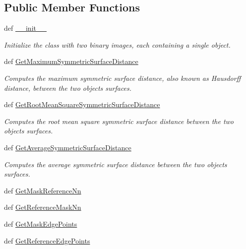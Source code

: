 \subsection*{Public Member Functions}
\begin{DoxyCompactItemize}
\item 
def \hyperlink{classmedpy_1_1metric_1_1Surface_1_1Surface_ab5851eb70bda096a86fb6716060167b7}{\_\-\_\-init\_\-\_\-}
\begin{DoxyCompactList}\small\item\em Initialize the class with two binary images, each containing a single object. \end{DoxyCompactList}\item 
def \hyperlink{classmedpy_1_1metric_1_1Surface_1_1Surface_a9cdf888536ae9f7ed0576fac57ac77c2}{GetMaximumSymmetricSurfaceDistance}
\begin{DoxyCompactList}\small\item\em Computes the maximum symmetric surface distance, also known as Hausdorff distance, between the two objects surfaces. \end{DoxyCompactList}\item 
def \hyperlink{classmedpy_1_1metric_1_1Surface_1_1Surface_a0d6bcf9373cb1a2f9f04ca28b8d208f9}{GetRootMeanSquareSymmetricSurfaceDistance}
\begin{DoxyCompactList}\small\item\em Computes the root mean square symmetric surface distance between the two objects surfaces. \end{DoxyCompactList}\item 
def \hyperlink{classmedpy_1_1metric_1_1Surface_1_1Surface_a1f1c1e69dd67604384b5aa5656551452}{GetAverageSymmetricSurfaceDistance}
\begin{DoxyCompactList}\small\item\em Computes the average symmetric surface distance between the two objects surfaces. \end{DoxyCompactList}\item 
def \hyperlink{classmedpy_1_1metric_1_1Surface_1_1Surface_a4d61287dc4a1f0caa0571c68ec1a5cb7}{GetMaskReferenceNn}
\item 
def \hyperlink{classmedpy_1_1metric_1_1Surface_1_1Surface_a1ae1504a6292716aa10a53cf98d61b81}{GetReferenceMaskNn}
\item 
def \hyperlink{classmedpy_1_1metric_1_1Surface_1_1Surface_a70d79edef12225a428163cea7dffcf0d}{GetMaskEdgePoints}
\item 
def \hyperlink{classmedpy_1_1metric_1_1Surface_1_1Surface_af373420f97720cbd0680cd7a23f18417}{GetReferenceEdgePoints}
\end{DoxyCompactItemize}
